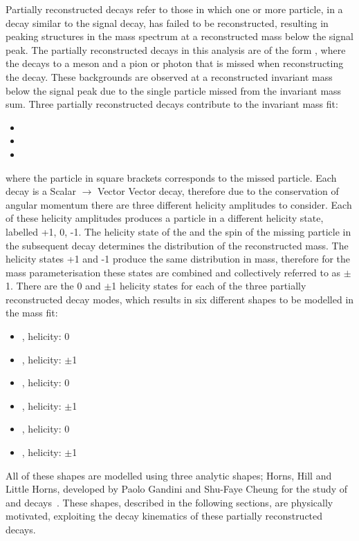 Partially reconstructed decays refer to those in which one or more particle, in a \B decay similar to the signal decay, has failed to be reconstructed, resulting in peaking structures in the \B mass spectrum at a reconstructed mass below the signal peak. The partially reconstructed decays in this analysis are of the form \decay{\B}{\Dstar\Kstar}, where the \Dstar decays to a \Dz meson and a pion or photon that is missed when reconstructing the decay. These backgrounds are observed at a reconstructed invariant mass below the signal peak due to the single particle missed from the invariant mass sum. Three partially reconstructed decays contribute to the invariant mass fit:

\begin{itemize}
\item{\decay{\Bm}{(\decay{\Dstarz}{\Dz[\piz]})\Kstarm}}
\item{\decay{\Bm}{(\decay{\Dstarz}{\Dz[\gamma]})\Kstarm}}
\item{\decay{\Bd}{(\decay{\Dstarp}{\Dz[\pip]})\Kstarm}}
\end{itemize}
where the particle in square brackets corresponds to the missed particle. Each \decay{\B}{\Dstar\Kstar} decay is a Scalar $\to$ Vector Vector decay, therefore due to the conservation of angular momentum there are three different helicity amplitudes to consider. Each of these helicity amplitudes produces a \Dstar particle in a different helicity state, labelled +1, 0, -1. The helicity state of the \Dstar and the spin of the missing particle in the subsequent \Dstar decay determines the distribution of the reconstructed \B mass. The helicity states +1 and -1 produce the same distribution in \Bm mass, therefore for the mass parameterisation these states are combined and collectively referred to as $\pm$1. There are the 0 and $\pm$1 \Dstar helicity states for each of the three partially reconstructed decay modes, which results in six different shapes to be modelled in the mass fit:
\begin{itemize}
\item{\decay{\Bm}{(\decay{\Dstarz}{\Dz[\piz]})\Kstarm}, \Dstarz helicity: 0} 
\item{\decay{\Bm}{(\decay{\Dstarz}{\Dz[\piz]})\Kstarm}, \Dstarz helicity: $\pm$1} 
\item{\decay{\Bm}{(\decay{\Dstarz}{\Dz[\gamma]})\Kstarm}, \Dstarz helicity: 0}
\item{\decay{\Bm}{(\decay{\Dstarz}{\Dz[\gamma]})\Kstarm}, \Dstarz helicity: $\pm$1}
\item{\decay{\Bd}{(\decay{\Dstarp}{\Dz[\pip]})\Kstarm}, \Dstarp helicity: 0}
\item{\decay{\Bd}{(\decay{\Dstarp}{\Dz[\pip]})\Kstarm}, \Dstarp helicity: $\pm$1}
\end{itemize}
All of these shapes are modelled using three analytic shapes; Horns, Hill and Little Horns, developed by Paolo Gandini and Shu-Faye Cheung for the study of  and \decay{\Bz}{\D\Kstarz} decays~\cite{LHCb-PAPER-2017-021,LHCb-PAPER-2016-006}. These shapes, described in the following sections, are physically motivated, exploiting the decay kinematics of these partially reconstructed decays.

